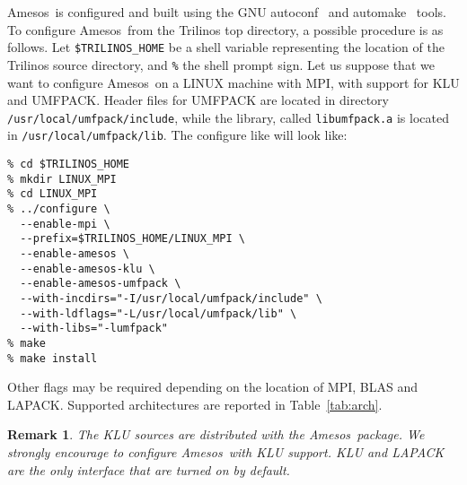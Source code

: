 \documentclass[11pt]{SANDreport}
\newcommand{\amesos}{{\sc Amesos}}
\newtheorem{remark}{Remark}
\begin{document}
\amesos\ is configured and built using the GNU autoconf~\cite{Autoconf}
and automake~\cite{Automake} tools. To configure \amesos\ from the
Trilinos top directory, a possible procedure is as follows.  Let
\verb!$TRILINOS_HOME! be a shell variable representing the location
of the Trilinos source directory, and \verb!%! the shell prompt sign.  
Let us suppose that we want to configure \amesos\ on a
LINUX machine with MPI, with support
for KLU and UMFPACK. Header files for UMFPACK are located
in directory \verb!/usr/local/umfpack/include!, while the library,
called \verb!libumfpack.a! is located in \verb!/usr/local/umfpack/lib!.
The configure like will look like:
\begin{verbatim}
% cd $TRILINOS_HOME
% mkdir LINUX_MPI
% cd LINUX_MPI
% ../configure \
  --enable-mpi \
  --prefix=$TRILINOS_HOME/LINUX_MPI \
  --enable-amesos \
  --enable-amesos-klu \
  --enable-amesos-umfpack \
  --with-incdirs="-I/usr/local/umfpack/include" \
  --with-ldflags="-L/usr/local/umfpack/lib" \
  --with-libs="-lumfpack"
% make
% make install
\end{verbatim}
Other flags may be required depending on the location of
 MPI, BLAS and LAPACK. Supported architectures are reported 
 in Table~\ref{tab:arch}.

\begin{remark}
The KLU sources are distributed with the \amesos\ package. We strongly
encourage to configure \amesos\ with KLU support. KLU and LAPACK are the only
interface that are turned on by default.
\end{remark}
\end{document}
